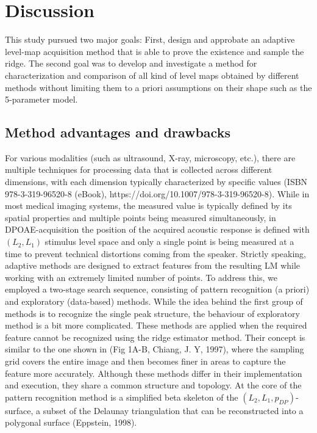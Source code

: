 \documentclass[journal,twoside,web]{ieeecolor2}
\begin{document}
\section{Discussion}
This study pursued two major goals: First, design and approbate an adaptive level-map acquisition method that is able to prove the existence and sample the ridge. The second goal was to develop and investigate a method for characterization and comparison of all kind of level maps obtained by different methods without limiting them to a priori assumptions on their shape such as the 5-parameter model.

\subsection{Method advantages and drawbacks}
For various modalities (such as ultrasound, X-ray, microscopy, etc.), there are multiple techniques for processing data that is collected across different dimensions, with each dimension typically characterized by specific values (ISBN 978-3-319-96520-8 (eBook), https://doi.org/10.1007/978-3-319-96520-8).
While in most medical imaging systems, the measured value is typically defined by its spatial properties and multiple points being measured simultaneously, in DPOAE-acquisition the position of the acquired acoustic response is defined with $(L_2, L_1)$ stimulus level space and only a single point is being measured at a time to prevent technical distortions coming from the speaker.
Strictly speaking, adaptive methods are designed to extract features from the resulting LM while working with an extremely limited number of points. To address this, we employed a two-stage search sequence, consisting of pattern recognition (a priori) and exploratory (data-based) methods. While the idea behind the first group of methods is to recognize the single peak structure, the behaviour of exploratory method is a bit more complicated. These methods are applied when the required feature cannot be recognized using the ridge estimator method. Their concept is similar to the one shown in (Fig 1A-B, Chiang, J. Y, 1997), where the sampling grid covers the entire image and then becomes finer in areas to capture the feature more accurately.
Although these methods differ in their implementation and execution, they share a common structure and topology. At the core of the pattern recognition method is a simplified beta skeleton of the $(L_2, L_1, p_{DP})$-surface, a subset of the Delaunay triangulation that can be reconstructed into a polygonal surface (Eppstein, 1998).
\end{document}
